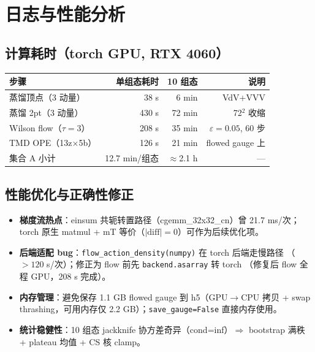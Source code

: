 \documentclass[11pt]{article}
\begin{document}
\section{日志与性能分析}
\subsection{计算耗时（torch GPU, RTX 4060）}
\begin{center}
\begin{tabular}{lrrr}
\hline
步骤 & 单组态耗时 & 10 组态 & 说明 \\
\hline
蒸馏顶点（3 动量） & 38 s & 6 min & VdV+VVV \\
蒸馏 2pt（3 动量） & 430 s & 72 min & 72$^2$ 收缩 \\
Wilson flow（$\tau{=}3$） & 208 s & 35 min & $\varepsilon{=}0.05$, 60 步 \\
TMD OPE（13z$\times$5b） & 126 s & 21 min & flowed gauge 上 \\
集合 A 小计 & 12.7 min/组态 & $\approx$2.1 h & --- \\
\hline
\end{tabular}
\end{center}
\subsection{性能优化与正确性修正}
\begin{itemize}
\item \textbf{梯度流热点}：einsum 共轭转置路径（cgemm\_32x32\_cn）曾 21.7 ms/次；
torch 原生 matmul + mT 等价（$|\text{diff}|=0$）可作为后续优化项。
\item \textbf{后端适配 bug}：\texttt{flow\_action\_density(numpy)} 在 torch 后端走慢路径
（$>120$ s/次）；修正为 flow 前先 \texttt{backend.asarray} 转 torch
（修复后 flow 全程 GPU，208 s 完成）。
\item \textbf{内存管理}：避免保存 1.1 GB flowed gauge 到 h5（GPU$\to$CPU 拷贝 +
swap thrashing，可用内存仅 2.2 GB）；\texttt{save\_gauge=False} 直接内存使用。
\item \textbf{统计稳健性}：10 组态 jackknife 协方差奇异（cond=inf）$\Rightarrow$
bootstrap 满秩 + plateau 均值 + CS 核 clamp。
\end{itemize}
\end{document}
